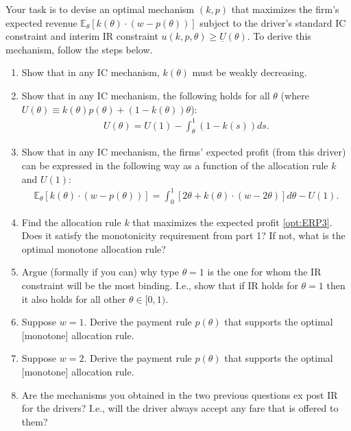 \documentclass[a4paper]{article}
\begin{document}
Your task is to devise an optimal mechanism $(k,p)$ that maximizes the firm's expected revenue $\mathbb{E}_\theta [k(\theta) \cdot (w-p(\theta))]$ subject to the driver's standard IC constraint and interim IR constraint $u(k,p,\theta) \geq \underline{U}(\theta)$. To derive this mechanism, follow the steps below.


\begin{enumerate}
	\item Show that in any IC mechanism, $k(\theta)$ must be weakly decreasing.
	\item Show that in any IC mechanism, the following holds for all $\theta$ (where $U(\theta) \equiv k(\theta) p(\theta) + (1-k(\theta)) \theta$):
	\begin{align}
		\label{opt:ERP2}
		U(\theta) = U(1) - \int_{\theta}^{1} (1-k(s)) ds.
	\end{align}
	\item Show that in any IC mechanism, the firms' expected profit (from this driver) can be expressed in the following way as a function of the allocation rule $k$ and $U(1)$:
	\begin{align}
		\label{opt:ERP3}
		\mathbb{E}_\theta [k(\theta)\cdot (w-p(\theta))] = \int_0^1 \left[ 2\theta + k(\theta) \cdot (w - 2\theta ) \right] d\theta - U(1).
	\end{align}
	\item Find the allocation rule $k$ that maximizes the expected profit \eqref{opt:ERP3}. Does it satisfy the monotonicity requirement from part 1? If not, what is the optimal monotone allocation rule?
	\item Argue (formally if you can) why type $\theta=1$ is the one for whom the IR constraint will be the most binding. I.e., show that if IR holds for $\theta=1$ then it also holds for all other $\theta \in [0,1)$.
	\item Suppose $w=1$. Derive the payment rule $p(\theta)$ that supports the optimal [monotone] allocation rule.
	\item Suppose $w=2$. Derive the payment rule $p(\theta)$ that supports the optimal [monotone] allocation rule.
	\item Are the mechanisms you obtained in the two previous questions ex post IR for the drivers? I.e., will the driver always accept any fare that is offered to them?
\end{enumerate}
\end{document}
